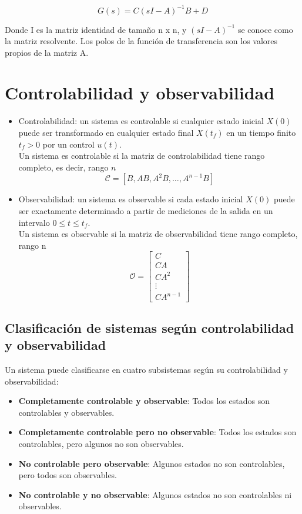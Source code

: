\documentclass[legalpaper,twocolumn]{article}
\begin{document}
\[ G(s) = C (sI - A)^{-1} B + D \]

Donde I es la matriz identidad de tamaño n x n, y $(sI - A)^{-1}$ se conoce como la matriz resolvente. Los polos de la función de transferencia son los valores propios de la matriz A.

\section*{Controlabilidad y observabilidad}

\begin{itemize}
    \item Controlabilidad: un sistema es controlable si cualquier estado inicial \( X(0) \) puede ser transformado en cualquier estado final \( X(t_f) \) en un tiempo finito \( t_f > 0 \) por un control \( u(t) \). \\ Un sistema es controlable si la matriz de controlabilidad tiene rango completo, es decir, rango $n$ \[ \mathcal{C} = [B, AB, A^2 B, \dots, A^{n-1} B] \]
    \item  Observabilidad: un sistema es observable si cada estado inicial \( X(0) \) puede ser exactamente determinado a partir de mediciones de la salida en un intervalo $0\leq t \leq t_f$. \\ Un sistema es observable si la matriz de observabilidad tiene rango completo, rango n \[ \mathcal{O} = \begin{bmatrix} C \\ CA \\ CA^2 \\ \vdots \\ CA^{n-1} \end{bmatrix} \]

\end{itemize}

\subsection*{Clasificación de sistemas según controlabilidad y observabilidad}

Un sistema puede clasificarse en cuatro subsistemas según su controlabilidad y observabilidad:

\begin{itemize}
    \item \textbf{Completamente controlable y observable}: Todos los estados son controlables y observables.
    \item \textbf{Completamente controlable pero no observable}: Todos los estados son controlables, pero algunos no son observables.
    \item \textbf{No controlable pero observable}: Algunos estados no son controlables, pero todos son observables.
    \item \textbf{No controlable y no observable}: Algunos estados no son controlables ni observables.
\end{itemize}
\end{document}

